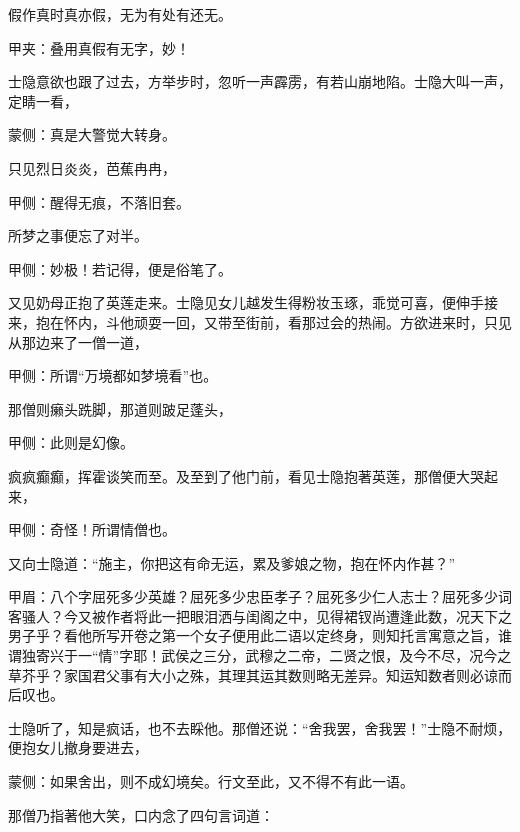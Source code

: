 \begin{poem}
    \begin{pl}假作真时真亦假，无为有处有还无。\end{pl}
    \begin{note}甲夹：叠用真假有无字，妙！\end{note}
\end{poem}


\begin{parag}
    士隐意欲也跟了过去，方举步时，忽听一声霹雳，有若山崩地陷。士隐大叫一声，定睛一看，\begin{note}蒙侧：真是大警觉大转身。\end{note}只见烈日炎炎，芭蕉冉冉，\begin{note}甲侧：醒得无痕，不落旧套。\end{note}所梦之事便忘了对半。\begin{note}甲侧：妙极！若记得，便是俗笔了。\end{note}
\end{parag}


\begin{parag}
    又见奶母正抱了英莲走来。士隐见女儿越发生得粉妆玉琢，乖觉可喜，便伸手接来，抱在怀内，斗他顽耍一回，又带至街前，看那过会的热闹。方欲进来时，只见从那边来了一僧一道，\begin{note}甲侧：所谓“万境都如梦境看”也。\end{note}那僧则癞头跣脚，那道则跛足蓬头，\begin{note}甲侧：此则是幻像。\end{note}疯疯癫癫，挥霍谈笑而至。及至到了他门前，看见士隐抱著英莲，那僧便大哭起来，\begin{note}甲侧：奇怪！所谓情僧也。\end{note}又向士隐道：“施主，你把这有命无运，累及爹娘之物，抱在怀内作甚？”\begin{note}甲眉：八个字屈死多少英雄？屈死多少忠臣孝子？屈死多少仁人志士？屈死多少词客骚人？今又被作者将此一把眼泪洒与闺阁之中，见得裙钗尚遭逢此数，况天下之男子乎？看他所写开卷之第一个女子便用此二语以定终身，则知托言寓意之旨，谁谓独寄兴于一“情”字耶！武侯之三分，武穆之二帝，二贤之恨，及今不尽，况今之草芥乎？家国君父事有大小之殊，其理其运其数则略无差异。知运知数者则必谅而后叹也。\end{note}士隐听了，知是疯话，也不去睬他。那僧还说：“舍我罢，舍我罢！”士隐不耐烦，便抱女儿撤身要进去，\begin{note}蒙侧：如果舍出，则不成幻境矣。行文至此，又不得不有此一语。\end{note}那僧乃指著他大笑，口内念了四句言词道：
\end{parag}


